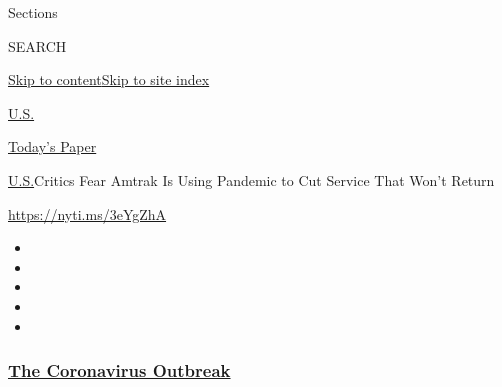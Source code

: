 Sections

SEARCH

\protect\hyperlink{site-content}{Skip to
content}\protect\hyperlink{site-index}{Skip to site index}

\href{https://www.nytimes3xbfgragh.onion/section/us}{U.S.}

\href{https://myaccount.nytimes3xbfgragh.onion/auth/login?response_type=cookie\&client_id=vi}{}

\href{https://www.nytimes3xbfgragh.onion/section/todayspaper}{Today's
Paper}

\href{/section/us}{U.S.}\textbar{}Critics Fear Amtrak Is Using Pandemic
to Cut Service That Won't Return

\url{https://nyti.ms/3eYgZhA}

\begin{itemize}
\item
\item
\item
\item
\item
\end{itemize}

\hypertarget{the-coronavirus-outbreak}{%
\subsubsection{\texorpdfstring{\href{https://www.nytimes3xbfgragh.onion/news-event/coronavirus?name=styln-coronavirus-national\&region=TOP_BANNER\&variant=undefined\&block=storyline_menu_recirc\&action=click\&pgtype=Article\&impression_id=48f69fa0-e3a6-11ea-92a9-439cc713b6c5}{The
Coronavirus
Outbreak}}{The Coronavirus Outbreak}}\label{the-coronavirus-outbreak}}

